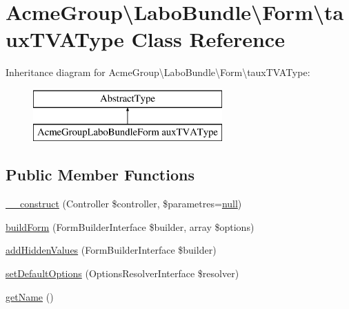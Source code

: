 \hypertarget{class_acme_group_1_1_labo_bundle_1_1_form_1_1taux_t_v_a_type}{\section{Acme\+Group\textbackslash{}Labo\+Bundle\textbackslash{}Form\textbackslash{}taux\+T\+V\+A\+Type Class Reference}
\label{class_acme_group_1_1_labo_bundle_1_1_form_1_1taux_t_v_a_type}
}
Inheritance diagram for Acme\+Group\textbackslash{}Labo\+Bundle\textbackslash{}Form\textbackslash{}taux\+T\+V\+A\+Type\+:\begin{figure}[H]
\begin{center}
\leavevmode
\includegraphics[height=2.000000cm]{class_acme_group_1_1_labo_bundle_1_1_form_1_1taux_t_v_a_type}
\end{center}
\end{figure}
\subsection*{Public Member Functions}
\begin{DoxyCompactItemize}
\item 
\hyperlink{class_acme_group_1_1_labo_bundle_1_1_form_1_1taux_t_v_a_type_ad4384149b5f088fb77ac5242b09b514e}{\+\_\+\+\_\+construct} (Controller \$controller, \$parametres=\hyperlink{validate_8js_afb8e110345c45e74478894341ab6b28e}{null})
\item 
\hyperlink{class_acme_group_1_1_labo_bundle_1_1_form_1_1taux_t_v_a_type_acd40dc21cdc337d1ee0c71170ec08153}{build\+Form} (Form\+Builder\+Interface \$builder, array \$options)
\item 
\hyperlink{class_acme_group_1_1_labo_bundle_1_1_form_1_1taux_t_v_a_type_a750aa6df4a6d24f9dd44f4bec21fab47}{add\+Hidden\+Values} (Form\+Builder\+Interface \$builder)
\item 
\hyperlink{class_acme_group_1_1_labo_bundle_1_1_form_1_1taux_t_v_a_type_a8c89ae9041dcd2abd645d9a496d335cf}{set\+Default\+Options} (Options\+Resolver\+Interface \$resolver)
\item 
\hyperlink{class_acme_group_1_1_labo_bundle_1_1_form_1_1taux_t_v_a_type_a755cccdc7d0987450bd4f1e88585da32}{get\+Name} ()
\end{DoxyCompactItemize}


